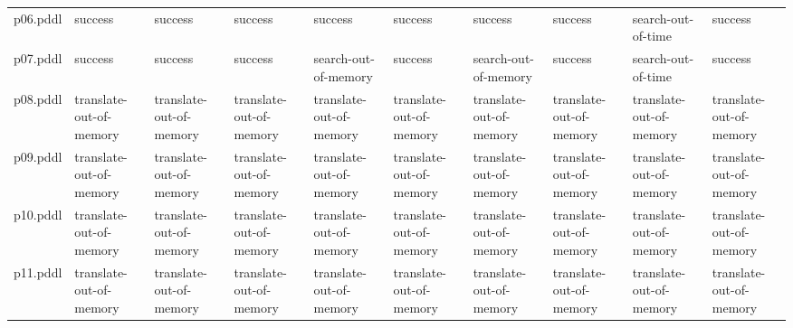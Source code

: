 \documentclass{article}
\begin{document}
\begin{tabular}{@{}lrrrrrrrrr@{}}
p06.pddl & \multicolumn{1}{|l|}{success} & \multicolumn{1}{|l|}{success} & \multicolumn{1}{|l|}{success} & \multicolumn{1}{|l|}{success} & \multicolumn{1}{|l|}{success} & \multicolumn{1}{|l|}{success} & \multicolumn{1}{|l|}{success} & \multicolumn{1}{|l|}{search-out-of-time} & \multicolumn{1}{|l|}{success} \\
p07.pddl & \multicolumn{1}{|l|}{success} & \multicolumn{1}{|l|}{success} & \multicolumn{1}{|l|}{success} & \multicolumn{1}{|l|}{search-out-of-memory} & \multicolumn{1}{|l|}{success} & \multicolumn{1}{|l|}{search-out-of-memory} & \multicolumn{1}{|l|}{success} & \multicolumn{1}{|l|}{search-out-of-time} & \multicolumn{1}{|l|}{success} \\
p08.pddl & \multicolumn{1}{|l|}{translate-out-of-memory} & \multicolumn{1}{|l|}{translate-out-of-memory} & \multicolumn{1}{|l|}{translate-out-of-memory} & \multicolumn{1}{|l|}{translate-out-of-memory} & \multicolumn{1}{|l|}{translate-out-of-memory} & \multicolumn{1}{|l|}{translate-out-of-memory} & \multicolumn{1}{|l|}{translate-out-of-memory} & \multicolumn{1}{|l|}{translate-out-of-memory} & \multicolumn{1}{|l|}{translate-out-of-memory} \\
p09.pddl & \multicolumn{1}{|l|}{translate-out-of-memory} & \multicolumn{1}{|l|}{translate-out-of-memory} & \multicolumn{1}{|l|}{translate-out-of-memory} & \multicolumn{1}{|l|}{translate-out-of-memory} & \multicolumn{1}{|l|}{translate-out-of-memory} & \multicolumn{1}{|l|}{translate-out-of-memory} & \multicolumn{1}{|l|}{translate-out-of-memory} & \multicolumn{1}{|l|}{translate-out-of-memory} & \multicolumn{1}{|l|}{translate-out-of-memory} \\
p10.pddl & \multicolumn{1}{|l|}{translate-out-of-memory} & \multicolumn{1}{|l|}{translate-out-of-memory} & \multicolumn{1}{|l|}{translate-out-of-memory} & \multicolumn{1}{|l|}{translate-out-of-memory} & \multicolumn{1}{|l|}{translate-out-of-memory} & \multicolumn{1}{|l|}{translate-out-of-memory} & \multicolumn{1}{|l|}{translate-out-of-memory} & \multicolumn{1}{|l|}{translate-out-of-memory} & \multicolumn{1}{|l|}{translate-out-of-memory} \\
p11.pddl & \multicolumn{1}{|l|}{translate-out-of-memory} & \multicolumn{1}{|l|}{translate-out-of-memory} & \multicolumn{1}{|l|}{translate-out-of-memory} & \multicolumn{1}{|l|}{translate-out-of-memory} & \multicolumn{1}{|l|}{translate-out-of-memory} & \multicolumn{1}{|l|}{translate-out-of-memory} & \multicolumn{1}{|l|}{translate-out-of-memory} & \multicolumn{1}{|l|}{translate-out-of-memory} & \multicolumn{1}{|l|}{translate-out-of-memory} \\

\end{tabular}
\end{document}
